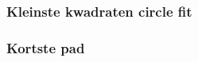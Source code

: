 
\subsubsection{Kleinste kwadraten circle fit}
\label{subsec: Kleinste kwadraten circle fit}


\subsubsection{Kortste pad}
\label{subsec: Kortste pad}
